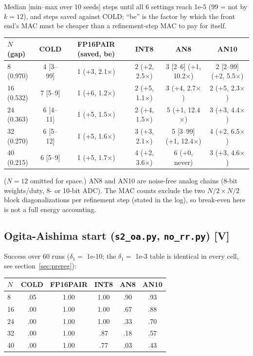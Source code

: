 \documentclass[11pt]{article}
\newcommand{\x}{$\times$}
\newcommand{\scr}[1]{\texttt{#1}}
\begin{document}
Median [min--max over 10 seeds] steps until all 6 settings reach 1e-5 (99 = not by $k = 12$), and steps saved against COLD; ``be'' is the factor by which the front end's MAC must be cheaper than a refinement-step MAC to pay for itself.

\begin{center}
\small
\small
\begin{tabular}{lccccc}
\toprule
$N$ (gap) & COLD & FP16PAIR (saved, be) & INT8 & AN8 & AN10 \\
\midrule
8 (0.970) & 4 [3--99] & 1 (+3, 2.1\x) & 2 (+2, 2.5\x) & 3 [2--6] (+1, 10.2\x) & 2 [2--99] (+2, 5.5\x) \\
16 (0.532) & 7 [5--9] & 1 (+6, 1.2\x) & 2 (+5, 1.1\x) & 3 (+4, 2.7\x) & 2 (+5, 2.3\x) \\
24 (0.363) & 6 [4--11] & 1 (+5, 1.5\x) & 2 (+4, 1.5\x) & 5 (+1, 12.4\x) & 3 (+3, 4.4\x) \\
32 (0.270) & 6 [5--12] & 1 (+5, 1.6\x) & 3 (+3, 2.1\x) & 5 [3--99] (+1, 12.4\x) & 4 (+2, 6.5\x) \\
40 (0.215) & 6 [5--9] & 1 (+5, 1.7\x) & 4 (+2, 3.6\x) & 6 (+0, never) & 3 (+3, 4.6\x) \\
\bottomrule
\end{tabular}
\end{center}

($N = 12$ omitted for space.) AN8 and AN10 are noise-free analog chains (8-bit weights/duty, 8- or 10-bit ADC). The MAC counts exclude the two $N/2 \times N/2$ block diagonalizations per refinement step (stated in the log), so break-even here is not a full energy accounting.

\subsection{Ogita-Aishima start (\scr{s2\_oa.py}, \scr{no\_rr.py}) [V]}\label{sec:oa}

Success over 60 runs ($\delta_1 = $ 1e-10; the $\delta_1 = $ 1e-3 table is identical in every cell, see section~\ref{sec:prereg}):

\begin{center}
\begin{tabular}{lccccc}
\toprule
$N$ & COLD & FP16PAIR & INT8 & AN8 & AN10 \\
\midrule
8 & .05 & 1.00 & 1.00 & .90 & .93 \\
16 & .00 & 1.00 & 1.00 & .67 & .88 \\
24 & .00 & 1.00 & 1.00 & .33 & .70 \\
32 & .00 & 1.00 & .87 & .18 & .57 \\
40 & .00 & 1.00 & .77 & .03 & .43 \\
\bottomrule
\end{tabular}
\end{center}
\end{document}
